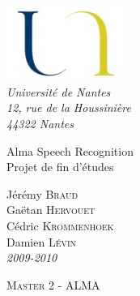\begin{titlepage}

\vspace*{0cm}



\begin{flushleft}
	\hspace{1cm} \includegraphics*[width=4cm]{images/logo.jpg}\\
	\hspace{1cm} \textsl{Université de Nantes}\\
	\hspace{1cm} \textsl{12, rue de la Houssinière}\\
	\hspace{1cm} \textit{44322 Nantes}
	\hrulefill
\end{flushleft}




\vspace{2cm}

\begin{flushright}

	{\fontsize{1.4cm}{1.65cm}\selectfont 
Alma Speech Recognition} 	 \\
	{\fontsize{0.7cm}{0.825cm}\selectfont 
Projet de fin d'études} 	 \\

	
	\vspace{1cm}
	

	
	\vspace{1cm}
	Jérémy \textsc{Braud} \\
	Gaëtan \textsc{Hervouet} \\
	Cédric \textsc{Krommenhoek} \\
	Damien \textsc{Lévin} \\
	\textit{2009-2010}
	
\end{flushright}


\vspace{0cm}

\begin{flushleft}



	\hspace{1cm} \textsc{Master 2 - ALMA}\\
	
\end{flushleft}

\hspace*{0,5cm}\hrulefill
\end{titlepage}
